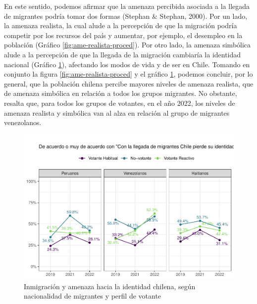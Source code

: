 \documentclass[
  12pt,
]{book}
\begin{document}
En este sentido, podemos afirmar que la amenaza percibida asociada a la llegada de migrantes podría tomar dos formas (Stephan \& Stephan, 2000). Por un lado, la amenaza realista, la cual alude a la percepción de que la migración podría competir por los recursos del país y aumentar, por ejemplo, el desempleo en la población (Gráfico \ref{fig:ame-realista-proced}). Por otro lado, la amenaza simbólica alude a la percepción de que la llegada de la migración cambiaría la identidad nacional (Gráfico \ref{fig:ame-simbolica-proced}), afectando los modos de vida y de ser en Chile. Tomando en conjunto la figura \ref{fig:ame-realista-proced} y el gráfico \ref{fig:ame-simbolica-proced}, podemos concluir, por lo general, que la población chilena percibe mayores niveles de amenaza realista, que de amenaza simbólica en relación a todos los grupos migrantes. No obstante, resalta que, para todos los grupos de votantes, en el año 2022, los niveles de amenaza realista y simbólica van al alza en relación al grupo de migrantes venezolanos.

\begin{figure}

{\centering \includegraphics{reporte-elsoc_files/figure-latex/ame-simbolica-proced-1} 

}

\caption{Inmigración y amenaza hacia la identidad chilena, según nacionalidad de migrantes y perfil de votante}\label{fig:ame-simbolica-proced}
\end{figure}
\end{document}
